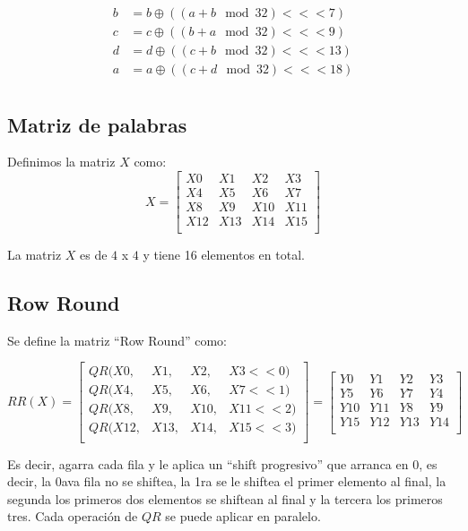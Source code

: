 \documentclass[12pt,a4paper]{report}
\begin{document}
$$
\begin{aligned}
b &= b \oplus (( a + b \mod 32) <<< 7) \\
c &= c \oplus (( b + a \mod 32) <<< 9) \\
d &= d \oplus (( c + b \mod 32) <<< 13) \\
a &= a \oplus (( c + d \mod 32) <<< 18) \\
\end{aligned}
$$

\subsection{Matriz de palabras}
Definimos la matriz $X$ como:
$$
X = \begin{bmatrix}
   X0 & X1 & X2 & X3 \\
   X4 & X5 & X6 & X7 \\
   X8 & X9 & X10 & X11 \\
   X12 & X13 & X14 & X15 \\
    \end{bmatrix}
$$

La matriz $X$ es de $4$ x $4$ y tiene 16 elementos en total.

\subsection{Row Round}
\label{sec:rowround}
Se define la matriz ``Row Round'' como:

$$
RR(X) = \begin{bmatrix}
  QR(X0, & X1, & X2, & X3 << 0)\\
  QR(X4, & X5, & X6, & X7 << 1)\\
  QR(X8, & X9, & X10, & X11 << 2)\\
  QR(X12, & X13, & X14, & X15 << 3)\\
\end{bmatrix} =
\begin{bmatrix}
   Y0  & Y1  & Y2  & Y3 \\
   Y5  & Y6  & Y7  & Y4 \\
   Y10 & Y11 & Y8  & Y9 \\
   Y15 & Y12 & Y13 & Y14 \\
    \end{bmatrix}
$$

Es decir, agarra cada fila y le aplica un ``shift progresivo'' que arranca en 0, es decir, la 0ava fila no se shiftea, la 1ra se le shiftea el primer elemento al final, la segunda los primeros dos elementos se shiftean al final y la tercera los primeros tres.
Cada operación de $QR$ se puede aplicar en paralelo.
\end{document}
